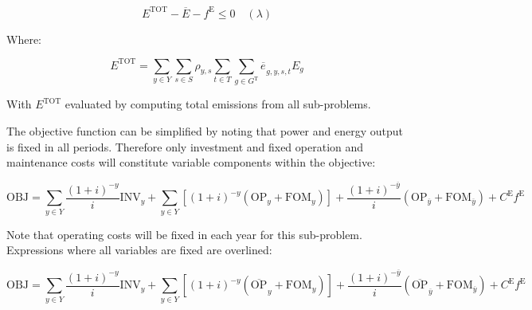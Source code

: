 \documentclass{article}
\newcommand{\sGeneratorsThermal}{G^{\mathrm{T}}}
\newcommand{\sYears}{Y}
\newcommand{\sScenarios}{S}
\newcommand{\sIntervals}{T}
\newcommand{\iGenerator}{g}
\newcommand{\iYear}{y}
\newcommand{\iYearTerminal}{\overline{\iYear}}
\newcommand{\iScenario}{s}
\newcommand{\iInterval}{t}
\newcommand{\cOperatingCost}[1][\iYear,\iScenario]{\mathrm{OP}_{#1}}
\newcommand{\cFixedOperationsMaintenanceCost}[1][\iGenerator]{\mathrm{FOM}_{#1}}
\newcommand{\cScenarioDuration}[1][\iYear,\iScenario]{\rho_{#1}}
\newcommand{\cEmissionsIntensity}[1][\iGenerator]{E_{#1}}
\newcommand{\cInvestmentCost}[1][\iYear]{\mathrm{INV}_{#1}}
\newcommand{\cInterestRate}{i}
\newcommand{\cEmmissionsCumulativeTarget}{\overline{E}}
\newcommand{\cEmissionsTargetViolationPenalty}{C^{\mathrm{E}}}
\newcommand{\cObjectiveFunction}{\mathrm{OBJ}}
\newcommand{\cEmissionsTotal}{E^{\mathrm{TOT}}}
\newcommand{\vEnergy}[1][\iGenerator,\iYear,\iScenario,\iInterval]{e_{#1}}
\newcommand{\vEmissionsTargetViolation}{f^{\mathrm{E}}}
\begin{document}
\begin{equation}
	\cEmissionsTotal - \cEmmissionsCumulativeTarget - \vEmissionsTargetViolation \leq 0 \quad (\lambda)
\end{equation}

Where:

\begin{equation}
	\cEmissionsTotal = \sum\limits_{\iYear \in \sYears} \sum\limits_{\iScenario \in \sScenarios} \cScenarioDuration \sum\limits_{\iInterval \in \sIntervals} \sum\limits_{\iGenerator \in \sGeneratorsThermal} \overline{\vEnergy[]}_{\iGenerator,\iYear,\iScenario,\iInterval} \cEmissionsIntensity
\end{equation}

With $\cEmissionsTotal$ evaluated by computing total emissions from all sub-problems. 

The objective function can be simplified by noting that power and energy output is fixed in all periods. Therefore only investment and fixed operation and maintenance costs will constitute variable components within the objective:

\begin{equation}
\cObjectiveFunction = \sum\limits_{\iYear \in \sYears} \frac{(1+\cInterestRate)^{-\iYear}}{\cInterestRate}\cInvestmentCost + \sum\limits_{\iYear \in \sYears} \left[(1+\cInterestRate)^{-\iYear} (\cOperatingCost[\iYear] + \cFixedOperationsMaintenanceCost[\iYear]) \right] + \frac{(1+\cInterestRate)^{-\iYearTerminal}}{\cInterestRate} \left(\cOperatingCost[\iYearTerminal] + \cFixedOperationsMaintenanceCost[\iYearTerminal] \right) + \cEmissionsTargetViolationPenalty \vEmissionsTargetViolation
\end{equation}

Note that operating costs will be fixed in each year for this sub-problem. Expressions where all variables are fixed are overlined:

\begin{equation}
\cObjectiveFunction = \sum\limits_{\iYear \in \sYears} \frac{(1+\cInterestRate)^{-\iYear}}{\cInterestRate}\cInvestmentCost + \sum\limits_{\iYear \in \sYears} \left[(1+\cInterestRate)^{-\iYear} (\overline{\cOperatingCost[]}_{\iYear} + \cFixedOperationsMaintenanceCost[\iYear]) \right] + \frac{(1+\cInterestRate)^{-\iYearTerminal}}{\cInterestRate} \left(\overline{\cOperatingCost[]}_{\iYearTerminal} + \cFixedOperationsMaintenanceCost[\iYearTerminal] \right) + \cEmissionsTargetViolationPenalty \vEmissionsTargetViolation
\end{equation}
\end{document}
